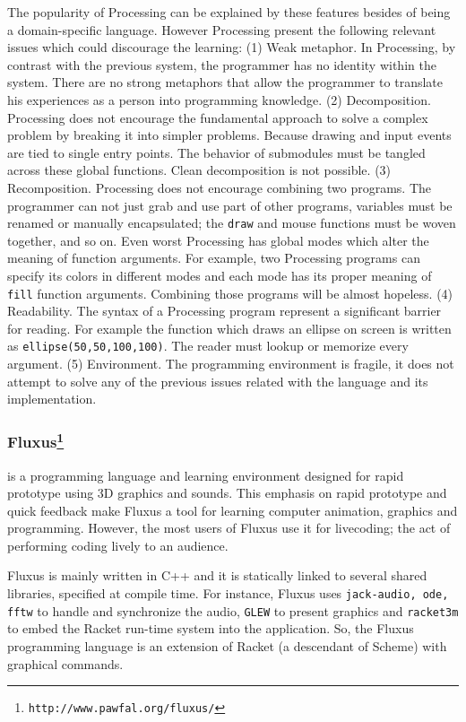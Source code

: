 The popularity of Processing can be explained by these features besides of being a domain-specific language. However Processing present the following relevant issues which could discourage the learning: (1) Weak metaphor. In Processing, by contrast with the previous system, the programmer has no identity within the system. There are no strong metaphors that allow the programmer to translate his experiences as a person into programming knowledge. (2) Decomposition. Processing does not encourage the fundamental approach to solve a complex problem by breaking it into simpler problems. Because drawing and input events are tied to single entry points. The behavior of submodules must be tangled across these global functions. Clean decomposition is not possible. (3) Recomposition. Processing does not encourage combining two programs. The programmer can not just grab and use part of other programs, variables must be renamed or manually encapsulated; the \texttt{draw} and mouse functions must be woven together, and so on. Even worst Processing has global modes which alter the meaning of function arguments. For example, two Processing programs can specify its colors in different modes and each mode has its proper meaning of \texttt{fill} function arguments. Combining those programs will be almost hopeless. (4) Readability. The syntax of a Processing program represent a significant barrier for reading. For example the function which draws an ellipse on screen is written as \texttt{ellipse(50,50,100,100)}. The reader must lookup or memorize every argument. (5) Environment. The programming environment is fragile, it does not attempt to solve any of the previous issues related with the language and its implementation. 
\subsubsection{Fluxus\protect\footnote{\texttt{http://www.pawfal.org/fluxus/}}} is a programming language and learning environment designed for rapid prototype using 3D graphics and sounds. This emphasis on rapid prototype and quick feedback make Fluxus a tool for learning computer animation, graphics and programming. However, the most users of Fluxus use it for livecoding; the act of performing coding lively to an
audience.

Fluxus is mainly written in C++ and it is statically linked to several shared libraries, specified at compile time. For instance, Fluxus uses \texttt{jack-audio, ode, fftw} to handle and synchronize the audio, \texttt{GLEW} to present graphics and \texttt{racket3m} to embed the Racket run-time system into the application. So, the Fluxus programming language is an extension of Racket (a descendant of Scheme) with graphical commands. 

